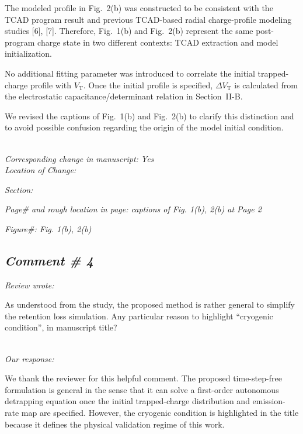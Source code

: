\documentclass[11pt]{article}
\begin{document}
The modeled profile in Fig.~2(b) was constructed to be consistent with the TCAD program result and previous TCAD-based radial charge-profile modeling studies [6], [7].
Therefore, Fig.~1(b) and Fig.~2(b) represent the same post-program charge state in two different contexts: TCAD extraction and model initialization.

No additional fitting parameter was introduced to correlate the initial trapped-charge profile with $V_\mathrm{T}$.
Once the initial profile is specified, $\Delta V_\mathrm{T}$ is calculated from the electrostatic capacitance/determinant relation in Section~II-B.

We revised the captions of Fig.~1(b) and Fig.~2(b) to clarify this distinction and to avoid possible confusion regarding the origin of the model initial condition.

\noindent \textit{\\Corresponding change in manuscript: Yes \\Location of Change:}

\hspace{40pt} \noindent \textit{Section: \uppercase\expandafter{}}

\hspace{40pt} \noindent \textit{Page\# and rough location in page: captions of Fig. 1(b), 2(b) at Page 2}

\hspace{40pt} \noindent \textit{Figure\#: Fig. 1(b), 2(b) }

\subsection*{\textit{Comment \# 4}}

\noindent \textit{Review wrote: }

As understood from the study, the proposed method is rather general to simplify the retention loss simulation.
Any particular reason to highlight “cryogenic condition”, in manuscript title?

\noindent \textit{\\Our response: }

We thank the reviewer for this helpful comment.
The proposed time-step-free formulation is general in the sense that it can solve a first-order autonomous detrapping equation once the initial trapped-charge distribution and emission-rate map are specified.
However, the cryogenic condition is highlighted in the title because it defines the physical validation regime of this work.
\end{document}

